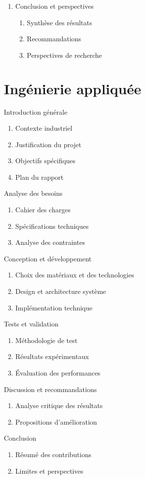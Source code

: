 \begin{enumerate}
    \item Conclusion et perspectives
    \begin{enumerate}
    \item Synthèse des résultats
    \item Recommandations
    \item Perspectives de recherche
    \end{enumerate}

\end{enumerate}

\section{Ingénierie appliquée}

\item Introduction générale
\begin{enumerate}
\item Contexte industriel
\item Justification du projet
\item Objectifs spécifiques
\item Plan du rapport
\end{enumerate}
\item Analyse des besoins
\begin{enumerate}
\item Cahier des charges
\item Spécifications techniques
\item Analyse des contraintes
\end{enumerate}
\item Conception et développement
\begin{enumerate}
\item Choix des matériaux et des technologies
\item Design et architecture système
\item Implémentation technique
\end{enumerate}
\item Tests et validation
\begin{enumerate}
\item Méthodologie de test
\item Résultats expérimentaux
\item Évaluation des performances
\end{enumerate}
\item Discussion et recommandations
\begin{enumerate}
\item Analyse critique des résultats
\item Propositions d'amélioration
\end{enumerate}
\item Conclusion
\begin{enumerate}
\item Résumé des contributions
\item Limites et perspectives
\end{enumerate}

